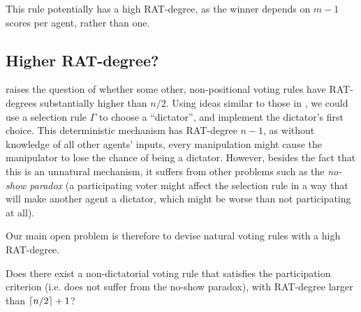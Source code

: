 This rule potentially has a high RAT-degree, as the winner depends on $m-1$ scores per agent, rather than one. 
\fi


\subsection{Higher RAT-degree?}
 raises the question of whether some other, non-positional voting rules have RAT-degrees substantially higher than $n/2$.
%
Using ideas similar to those in , 
we could use a selection rule $\Gamma$ to choose a ``dictator'', and implement the dictator's first choice.
This deterministic mechanism has RAT-degree $n-1$, as without knowledge of all other agents' inputs, every manipulation might cause the manipulator to lose the chance of being a dictator. 
However, besides the fact that this is an unnatural mechanism, it suffers from other problems such as the \emph{no-show paradox} (a participating voter might affect the selection rule in a way that will make another agent a dictator, which might be worse than not participating at all).

Our main open problem is therefore to devise natural voting rules with a high RAT-degree.
\begin{open}
Does there exist a non-dictatorial voting rule that satisfies the participation criterion (i.e. does not suffer from the no-show paradox),  with RAT-degree larger than $\left\lceil n/2 \right\rceil+1$? 
\end{open}

